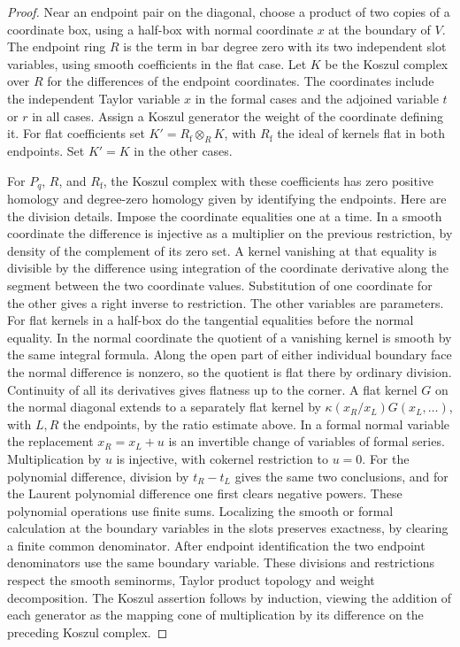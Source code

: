 \documentclass[11pt,oneside,reqno]{article}
\theoremstyle{plain}
\theoremstyle{definition}
\theoremstyle{remark}
\begin{document}
\begin{proof}
Near an endpoint pair on the diagonal, choose a product of two copies
of a coordinate box, using a half-box with normal coordinate \(x\)
at the boundary of \(V\). The endpoint ring \(R\) is the term in
bar degree zero with its two independent slot variables,
using smooth coefficients in the flat case. Let \(K\) be the
Koszul complex over \(R\) for the differences of the endpoint
coordinates. The coordinates include the independent Taylor
variable \(x\) in the formal cases and the adjoined variable \(t\)
or \(r\) in all cases. Assign a Koszul generator the weight of the
coordinate defining it. For flat coefficients set \(K'=R_{\mathrm f}
\otimes_R K\), with \(R_{\mathrm f}\) the ideal of kernels flat in
both endpoints. Set \(K'=K\) in the other cases.

For \(P_q\), \(R\), and \(R_{\mathrm f}\), the Koszul complex
with these coefficients has zero positive homology and degree-zero
homology given by identifying the endpoints. Here are the division
details. Impose the coordinate equalities one at a time. In a smooth
coordinate the difference is injective as a multiplier on the
previous restriction, by density of the complement of its zero
set. A kernel vanishing at that equality is divisible by the
difference using integration of the coordinate derivative along
the segment between the two coordinate values. Substitution of
one coordinate for the other gives a right inverse to restriction.
The other variables are parameters. For flat kernels in a half-box
do the tangential equalities before the normal equality. In the
normal coordinate the quotient of a vanishing kernel is smooth
by the same integral formula. Along the open part of either
individual boundary face the normal difference is nonzero, so the
quotient is flat there by ordinary division. Continuity of all its
derivatives gives flatness up to the corner. A flat kernel \(G\) on
the normal diagonal extends to a separately flat kernel by
\(\kappa(x_R/x_L)G(x_L,\ldots)\), with \(L,R\) the endpoints, by
the ratio estimate above. In a formal normal variable the
replacement \(x_R=x_L+u\) is an invertible change of variables
of formal series. Multiplication by \(u\) is injective, with
cokernel restriction to \(u=0\). For the polynomial difference,
division by \(t_R-t_L\) gives the same two conclusions, and
for the Laurent polynomial difference one first clears negative
powers. These polynomial operations use finite sums. Localizing
the smooth or formal calculation at the boundary variables in
the slots preserves exactness, by clearing a finite common
denominator. After endpoint identification the two endpoint
denominators use the same boundary variable. These divisions and
restrictions respect the smooth seminorms, Taylor product topology
and weight decomposition. The Koszul assertion follows by
induction, viewing the addition of each generator as the mapping
cone of multiplication by its difference on the preceding
Koszul complex.


\end{proof}
\end{document}
